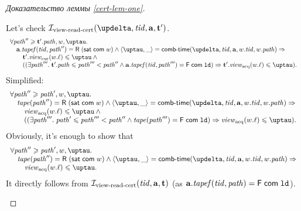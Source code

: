 \begin{proof}[Доказательство леммы \ref{cert-lem-one}]
\begin{itemize}
      Let's check $\invViewReadCERT(\delta, \tId, \aT, \tT')$.
      \[\begin{array}{l}
  \forall \cpath'' \ge \tT'.\cpath, \w, \tau. \\
\quad \aT.\tapef(\tId, \cpath'') = \tapeRead{(\tapeSatisfied{\Committed}{\w})} \land
   \angled{\tau, \_} = \deltaHmap(\delta, \tId, \aT, \w.\tId, \w.\cpath) \Rightarrow \\
\qquad \tT'.\Rcur(\w.\loc) \le \tau \land {} \\
\qquad ((\exists \cpath'''. \; \tT'.\cpath \le \cpath''' < \cpath'' \land 
             \aT.\tapef(\tId, \cpath''') = \tapeFence{\Committed}{\LD}) \Rightarrow \tT'.\Racq(\w.\loc) \le \tau). \\
      \end{array}\]
      Simplified:
      \[\begin{array}{l}
  \forall \cpath'' \ge \cpath', \w, \tau. \\
\quad \tape(\cpath'') = \tapeRead{(\tapeSatisfied{\Committed}{\w})} \land
   \angled{\tau, \_} = \deltaHmap(\delta, \tId, \aT, \w.\tId, \w.\cpath) \Rightarrow \\
\qquad \Racq(\w.\loc) \le \tau \land {} \\
\qquad ((\exists \cpath'''. \; \cpath' \le \cpath''' < \cpath'' \land 
             \tape(\cpath''') = \tapeFence{\Committed}{\LD}) \Rightarrow \Racq(\w.\loc) \le \tau). \\
      \end{array}\]
      Obviously, it's enough to show that
      \[\begin{array}{l}
  \forall \cpath'' \ge \cpath', \w, \tau. \\
\quad \tape(\cpath'') = \tapeRead{(\tapeSatisfied{\Committed}{\w})} \land
   \angled{\tau, \_} = \deltaHmap(\delta, \tId, \aT, \w.\tId, \w.\cpath) \Rightarrow \\
\qquad \Racq(\w.\loc) \le \tau.\\
      \end{array}\]
      It directly follows from $\mathcal{I}_{\textup{\rm view-read-cert}}(\mathit{tid}, \mathbf{a}, \mathbf{t})$ (as $\mathbf{a}.\mathit{tapef}(\mathit{tid}, \mathit{path}) = \textsf{F} \; \mathsf{com} \; \mathtt{ld}$).


\end{itemize}
\end{proof}
